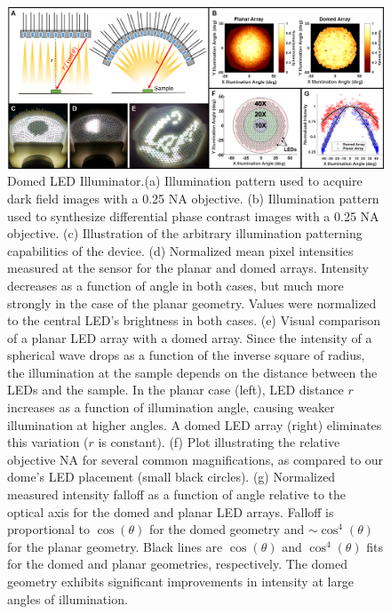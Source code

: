 \begin{figure} [ht]
\begin{center}
\includegraphics[width=\textwidth]{figures/fig_ccs_dome.png}
\end{center}
\caption {{ Domed LED Illuminator.}{(a)} Illumination pattern used to acquire dark field images with a 0.25 NA objective.
{(b)} Illumination pattern used to synthesize differential phase contrast images with a 0.25 NA objective.
{(c)} Illustration of the arbitrary illumination patterning capabilities of the device.
{(d)} Normalized mean pixel intensities measured at the sensor for the planar and domed arrays. Intensity decreases as a function of angle in both cases, but much more strongly in the case of the planar geometry. Values were normalized to the central LED's brightness in both cases.
{(e)} Visual comparison of a planar LED array with a domed array. Since the intensity of a spherical wave drops as a function of the inverse square of radius, the illumination at the sample depends on the distance between the LEDs and the sample. In the planar case (left), LED distance $r$ increases as a function of illumination angle, causing weaker illumination at higher angles. A domed LED array (right) eliminates this variation ($r$ is constant).
{(f)} Plot illustrating the relative objective NA for several common magnifications, as compared to our dome's LED placement (small black circles).
{(g)} Normalized measured intensity falloff as a function of angle relative to the optical axis for the domed and planar LED arrays. Falloff is proportional to $\cos(\theta)$ for the domed geometry and $\sim\cos^4(\theta)$ for the planar geometry. Black lines are $\cos(\theta)$ and $\cos^4(\theta)$ fits for the domed and planar geometries, respectively. The domed geometry exhibits significant improvements in intensity at large angles of illumination.
}
\label{fig:fabrication_ccs_dome}
\end{figure}

